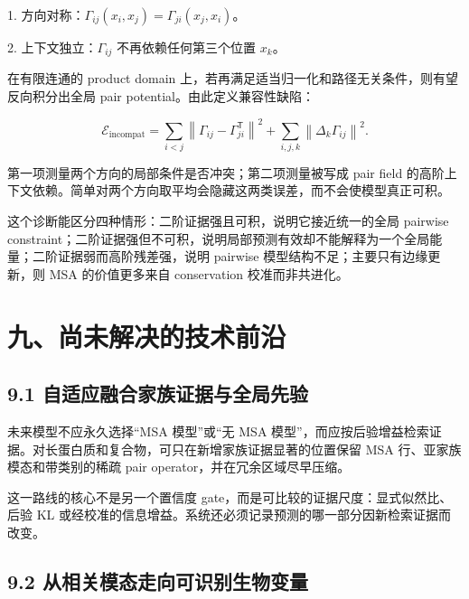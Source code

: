 \documentclass[10pt]{article}
\begin{document}
1. 方向对称：\(\Gamma_{ij}(x_i,x_j)=\Gamma_{ji}(x_j,x_i)\)。\par

2. 上下文独立：\(\Gamma_{ij}\) 不再依赖任何第三个位置 \(x_k\)。\par

在有限连通的 product domain 上，若再满足适当归一化和路径无关条件，则有望反向积分出全局 pair potential。由此定义兼容性缺陷：\par


\begin{equation}
\mathcal E_{\mathrm{incompat}}
=\sum_{i<j}\left\|\Gamma_{ij}-\Gamma_{ji}^{\mathsf T}\right\|^2
+\sum_{i,j,k}\left\|\Delta_k\Gamma_{ij}\right\|^2.
\end{equation}

第一项测量两个方向的局部条件是否冲突；第二项测量被写成 pair field 的高阶上下文依赖。简单对两个方向取平均会隐藏这两类误差，而不会使模型真正可积。\par

这个诊断能区分四种情形：二阶证据强且可积，说明它接近统一的全局 pairwise constraint；二阶证据强但不可积，说明局部预测有效却不能解释为一个全局能量；二阶证据弱而高阶残差强，说明 pairwise 模型结构不足；主要只有边缘更新，则 MSA 的价值更多来自 conservation 校准而非共进化。\par

\section*{九、尚未解决的技术前沿}


\subsection*{9.1 自适应融合家族证据与全局先验}


未来模型不应永久选择“M​​SA 模型”或“无 MSA 模型”，而应按后验增益检索证据。对长蛋白质和复合物，可只在新增家族证据显著的位置保留 MSA 行、亚家族模态和带类别的稀疏 pair operator，并在冗余区域尽早压缩。\par

这一路线的核心不是另一个置信度 gate，而是可比较的证据尺度：显式似然比、后验 KL 或经校准的信息增益。系统还必须记录预测的哪一部分因新检索证据而改变。\par

\subsection*{9.2 从相关模态走向可识别生物变量}
\end{document}
